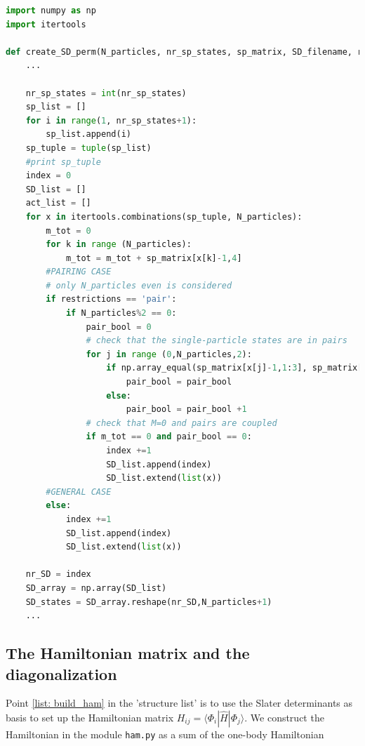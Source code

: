 \documentclass[twoside]{article}
\newcommand{\bra}[1]{\langle #1 |}
\newcommand{\ket}[1]{| #1 \rangle}
\begin{document}
\begin{lstlisting}[language=Python,label=create_SD,caption=The function \texttt{create\_SD\_perm} in the file \texttt{create\_table\_files.py} uses the Python function \texttt{itertools.combinations(,)} to create all the possible Slater determinants. In the case of the pairing model the Slater determinants are restricted to the ones with $\protect{M=0}$ and coupled pairs of single-particle states.]
import numpy as np
import itertools

def create_SD_perm(N_particles, nr_sp_states, sp_matrix, SD_filename, restrictions=''): 
    ...

    nr_sp_states = int(nr_sp_states)
    sp_list = []
    for i in range(1, nr_sp_states+1):
        sp_list.append(i)
    sp_tuple = tuple(sp_list)
    #print sp_tuple
    index = 0
    SD_list = []
    act_list = []
    for x in itertools.combinations(sp_tuple, N_particles):
        m_tot = 0
        for k in range (N_particles):
            m_tot = m_tot + sp_matrix[x[k]-1,4]
        #PAIRING CASE
        # only N_particles even is considered
        if restrictions == 'pair':
            if N_particles%2 == 0:
                pair_bool = 0
                # check that the single-particle states are in pairs
                for j in range (0,N_particles,2):
                    if np.array_equal(sp_matrix[x[j]-1,1:3], sp_matrix[x[j+1]-1,1:3]):
                        pair_bool = pair_bool 
                    else:
                        pair_bool = pair_bool +1
                # check that M=0 and pairs are coupled
                if m_tot == 0 and pair_bool == 0:
                    index +=1
                    SD_list.append(index)
                    SD_list.extend(list(x))
        #GENERAL CASE
        else:
            index +=1
            SD_list.append(index)
            SD_list.extend(list(x))
    
    nr_SD = index
    SD_array = np.array(SD_list)
    SD_states = SD_array.reshape(nr_SD,N_particles+1)
    ...

\end{lstlisting}

\subsection{The Hamiltonian matrix and the diagonalization}

Point \ref{list: build_ham} in the 'structure list' is to use the Slater determinants as basis to set up the Hamiltonian matrix $H_{ij}=\bra{\Phi_i} \hat H \ket{\Phi_j}$. We construct the Hamiltonian in the module \texttt{ham.py} as a sum of the one-body Hamiltonian
\end{document}
